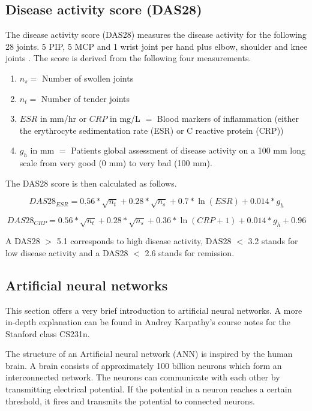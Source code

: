 \documentclass[12pt]{article}
\begin{document}
\subsection{Disease activity score (DAS28)}
\label{subsec:das}

The disease activity score (DAS28) measures the disease activity for the following 28 joints. 5 PIP, 5 MCP and 1 wrist joint per hand plus elbow, shoulder and knee joints \cite{runmc}. The score is derived from the following four measurements.

\begin{enumerate}[label=(\alph*)]
\item $n_s =$ Number of swollen joints
\item $n_t =$ Number of tender joints
\item $ESR$ in mm/hr or $CRP$ in mg/L $=$ Blood markers of inflammation (either the erythrocyte sedimentation rate (ESR) or C reactive protein (CRP))
\item $g_h$ in mm $=$ Patients global assessment of disease activity on a 100 mm long scale from very good (0 mm) to very bad (100 mm).
\end{enumerate}

The DAS28 score is then calculated as follows. \cite{runmc_formula}

$$DAS28_{ESR} = 0.56 * \sqrt{n_t} + 0.28 * \sqrt{n_s} + 0.7 * \ln{(ESR)} + 0.014 * g_h$$


$$DAS28_{CRP} = 0.56 * \sqrt{n_t} + 0.28 * \sqrt{n_s} + 0.36 * \ln{(CRP + 1)} + 0.014 * g_h + 0.96$$

A DAS28 $>$ 5.1 corresponds to high disease activity, DAS28 $<$ 3.2 stands for low disease activity and a DAS28 $<$ 2.6 stands for remission. \cite{runmc_formula}

\subsection{Artificial neural networks}
\label{subsec:ann}
This section offers a very brief introduction to artificial neural networks. A more in-depth explanation can be found in Andrey Karpathy's course notes for the Stanford class CS231n. \cite{karpathy}

The structure of an Artificial neural network (ANN) is inspired by the human brain. A brain consists of approximately 100 billion neurons which form an interconnected network. The neurons can communicate with each other by transmitting electrical potential. If the potential in a neuron reaches a certain threshold, it fires and transmits the potential to connected neurons. \cite{kruse_2016}
\end{document}
